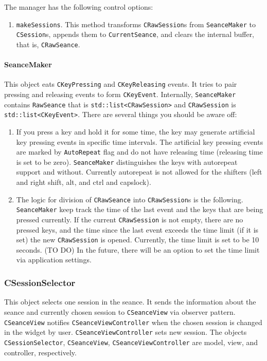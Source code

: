 \documentclass{article}
\begin{document}
The manager has the following control options:
\begin{enumerate}
\item \verb"makeSessions". This method transforms \verb"CRawSession"s from \verb"SeanceMaker" to \verb"CSession"s, appends them to \verb"CurrentSeance", and clears the internal buffer, that is, \verb"CRawSeance".
\end{enumerate}

\paragraph{SeanceMaker}
This object eats \verb"CKeyPressing" and \verb"CKeyReleasing" events. It tries to pair pressing and releasing events to form \verb"CKeyEvent". Internally, \verb"SeanceMaker" contains \verb"RawSeance" that is \verb"std::list<CRawSession>" and \verb"CRawSession" is \verb"std::list<CKeyEvent>". There are several things you should be aware off:
\begin{enumerate}
\item If you press a key and hold it for some time, the key may generate artificial key pressing events in specific time intervals. The artificial key pressing events are marked by \verb"AutoRepeat" flag and do not have releasing time (releasing time is set to be zero). \verb"SeanceMaker" distinguishes the keys with autorepeat support and without. Currently autorepeat is not allowed for the shifters (left and right shift, alt, and ctrl and capslock).

\item The logic for division of \verb"CRawSeance" into \verb"CRawSession"s is the following. \verb"SeanceMaker" keep track the time of the last event and the keys that are being pressed currently. If the current \verb"CRawSession" is not empty, there are no pressed keys, and the time since the last event exceeds the time limit (if it is set) the new \verb"CRawSession" is opened. Currently, the time limit is set to be 10 seconds. (TO DO) In the future, there will be an option to set the time limit via application settings.
\end{enumerate}

\subsubsection{CSessionSelector}

This object selects one session in the seance. It sends the information about the seance and currently chosen session to \verb"CSeanceView" via observer pattern. \verb"CSeanceView" notifies \verb"CSeanceViewController" when the chosen session is changed in the widget by user. \verb"CSeanceViewController" sets new session. The objects \verb"CSessionSelector", \verb"CSeanceView", \verb"CSeanceViewController" are model, view, and controller, respectively.
\end{document}
